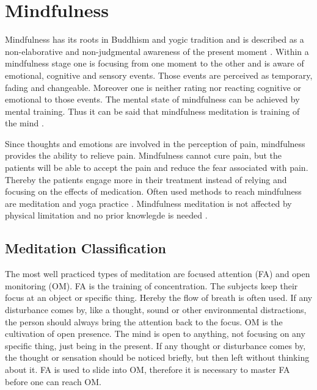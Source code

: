 \section{Mindfulness}
Mindfulness has its roots in Buddhism and yogic tradition and is described as a non-elaborative and non-judgmental awareness of the present moment \cite{Zeidan2016, Zeidan2012, Kabat1982,Tang2017}. Within a mindfulness stage one is focusing from one moment to the other and is aware of emotional, cognitive and sensory events. Those events are perceived as temporary, fading and changeable. Moreover one is neither rating nor reacting cognitive or emotional to those events. The mental state of mindfulness can be achieved by mental training. \cite{Zeidan2016, Zeidan2012}  Thus it can be said that mindfulness meditation is training of the mind \cite{Tang2017}. 

Since thoughts and emotions are involved in the perception of pain, mindfulness provides the ability to relieve pain. Mindfulness cannot cure pain, but the patients will be able to accept the pain and reduce the fear associated with pain. Thereby the patients engage more in their treatment instead of relying and focusing on the effects of medication. \cite{Jacob2016} Often used methods to reach mindfulness are meditation and yoga practice \cite{Kabat1982}.  Mindfulness meditation is not affected by physical limitation and no prior knowlegde is needed \cite{Tang2017}.


\subsection{Meditation Classification}
The most well practiced types of meditation are focused attention (FA) and open monitoring (OM). FA is the training of concentration. The subjects keep their focus at an object or specific thing. Hereby the flow of breath is often used.  If any disturbance comes by, like a thought, sound or other environmental distractions, the person should always bring the attention back to the focus. \cite{Zeidan2016} OM is the cultivation of open presence. The mind is open to anything, not focusing on any specific thing, just being in the present. If any thought or disturbance comes by, the thought or sensation should be noticed briefly, but then left without thinking about it. FA is used to slide into OM, therefore it is necessary to master FA before one can reach OM. \cite{ Zeidan2016, Kabat1982, Perlman2010} 


